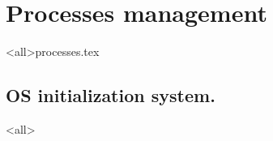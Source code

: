 \section{Processes management}
\mode<all>{{processes.tex}}
\subsection{OS initialization system.}
\mode<all>{}






